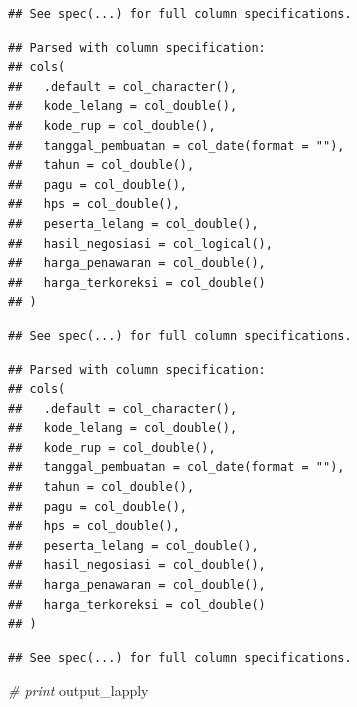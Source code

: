 \documentclass[]{book}
\newenvironment{Shaded}{\begin{snugshade}}{\end{snugshade}}
\newcommand{\CommentTok}[1]{\textcolor[rgb]{0.56,0.35,0.01}{\textit{#1}}}
\newcommand{\NormalTok}[1]{#1}
\begin{document}
\begin{verbatim}
## See spec(...) for full column specifications.
\end{verbatim}

\begin{verbatim}
## Parsed with column specification:
## cols(
##   .default = col_character(),
##   kode_lelang = col_double(),
##   kode_rup = col_double(),
##   tanggal_pembuatan = col_date(format = ""),
##   tahun = col_double(),
##   pagu = col_double(),
##   hps = col_double(),
##   peserta_lelang = col_double(),
##   hasil_negosiasi = col_logical(),
##   harga_penawaran = col_double(),
##   harga_terkoreksi = col_double()
## )
\end{verbatim}

\begin{verbatim}
## See spec(...) for full column specifications.
\end{verbatim}

\begin{verbatim}
## Parsed with column specification:
## cols(
##   .default = col_character(),
##   kode_lelang = col_double(),
##   kode_rup = col_double(),
##   tanggal_pembuatan = col_date(format = ""),
##   tahun = col_double(),
##   pagu = col_double(),
##   hps = col_double(),
##   peserta_lelang = col_double(),
##   hasil_negosiasi = col_double(),
##   harga_penawaran = col_double(),
##   harga_terkoreksi = col_double()
## )
\end{verbatim}

\begin{verbatim}
## See spec(...) for full column specifications.
\end{verbatim}

\begin{Shaded}
\begin{Highlighting}[]
\CommentTok{# print}
\NormalTok{output_lapply}
\end{Highlighting}
\end{Shaded}
\end{document}
